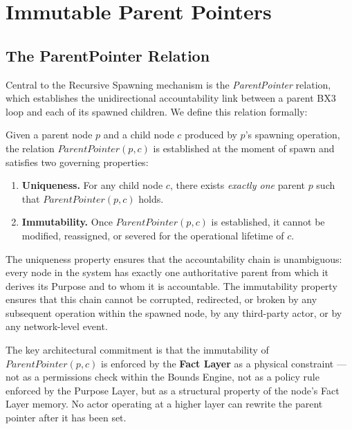 \section{Immutable Parent Pointers}
\label{sec:immutable-parent-pointers}

\subsection{The ParentPointer Relation}

Central to the Recursive Spawning mechanism is the \textit{ParentPointer} relation, which establishes the unidirectional accountability link between a parent BX3 loop and each of its spawned children. We define this relation formally:

\begin{definition}[ParentPointer]
\label{def:parent-pointer}
Given a parent node $p$ and a child node $c$ produced by $p$'s spawning operation, the relation $\textit{ParentPointer}(p, c)$ is established at the moment of spawn and satisfies two governing properties:

\begin{enumerate}[noitemsep]
    \item \textbf{Uniqueness.} For any child node $c$, there exists \textit{exactly one} parent $p$ such that $\textit{ParentPointer}(p, c)$ holds.
    \item \textbf{Immutability.} Once $\textit{ParentPointer}(p, c)$ is established, it cannot be modified, reassigned, or severed for the operational lifetime of $c$.
\end{enumerate}
\end{definition}

The uniqueness property ensures that the accountability chain is unambiguous: every node in the system has exactly one authoritative parent from which it derives its Purpose and to whom it is accountable. The immutability property ensures that this chain cannot be corrupted, redirected, or broken by any subsequent operation within the spawned node, by any third-party actor, or by any network-level event.

The key architectural commitment is that the immutability of $\textit{ParentPointer}(p, c)$ is enforced by the \textbf{Fact Layer} as a physical constraint — not as a permissions check within the Bounds Engine, not as a policy rule enforced by the Purpose Layer, but as a structural property of the node's Fact Layer memory. No actor operating at a higher layer can rewrite the parent pointer after it has been set.


